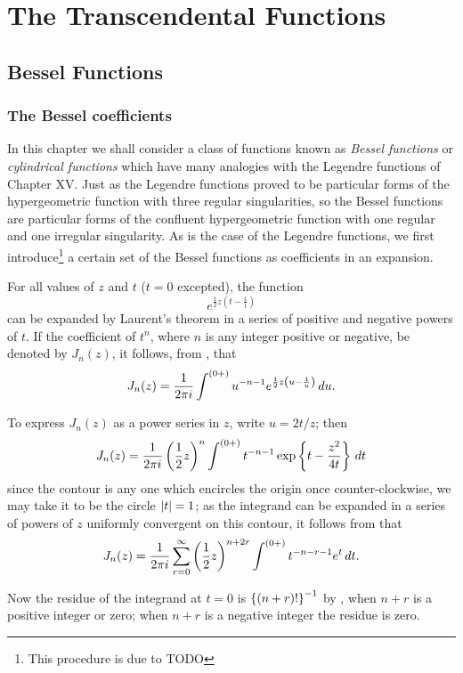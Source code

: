 \documentclass{book}
\begin{document}
\part{The Transcendental Functions}
\chapter{Bessel Functions}
 \section{The Bessel coefficients}
 In this chapter we shall consider a class of functions known as  \emph{Bessel functions}
 or \emph{cylindrical functions}
 which have many analogies with the Legendre functions of  Chapter XV.
 Just as the Legendre functions proved to be particular forms of the
 hypergeometric function with three regular singularities,  so the
 Bessel functions are particular forms of the  confluent
 hypergeometric function with one regular and one irregular
 singularity. As is the case of the Legendre functions, we first
 introduce\footnote{This procedure is due to TODO \Schlomilch}
 a certain set of the Bessel functions as coefficients in an
 expansion.

 For all values of $z$ and $t$ ($t=0$ excepted), the function
 $$
 e^{ \frac{1}{2} z \left( t - \frac{1}{t} \right)}
 $$
can be expanded by Laurent's theorem in a series of positive and
negative powers of $t$. If the coefficient of $t^n$, where $n$ is any
integer positive or negative, be denoted by $J_n(z)$, it follows, from 
, that 
$$
J_n(z) = \frac{1}{2\pi i} \int^{(0+)} u^{-n-1} e^{\frac{1}{2} z \left( u
    - \frac{1}{u} \right)} \, d u.
$$

To express $J_n(z)$ as a power series in $z$, write $u = 2t/z$; then
$$
J_n(z) = \frac{1}{2\pi i} \left( \frac{1}{2} z  \right)^n \int^{(0+)} t^{-n-1}
\exp \left\{  t - \frac{z^2}{4t}   \right\} \, d t
$$
since the contour is any one which encircles the origin once 
counter-clockwise, we may take it to be the circle 
$\left| t \right|=1$; as the integrand can be expanded in a series of powers
of $z$ uniformly convergent on this contour, it follows from
 that 
$$
J_n(z)
=
\frac{1}{2\pi i}
\sum_{r=0}^{\infty} \left( \frac{1}{2} z \right)^{n+2r} 
\int^{(0+)} t^{-n-r-1} e^t \, d t.
$$

Now the residue of the integrand at $t=0$ is 
$\left\{  (n+r)!   \right\}^{-1}$ by 
, when $n+r$ is a positive 
integer or zero; when $n+r$ is a negative integer 
the residue is zero.
\end{document}
